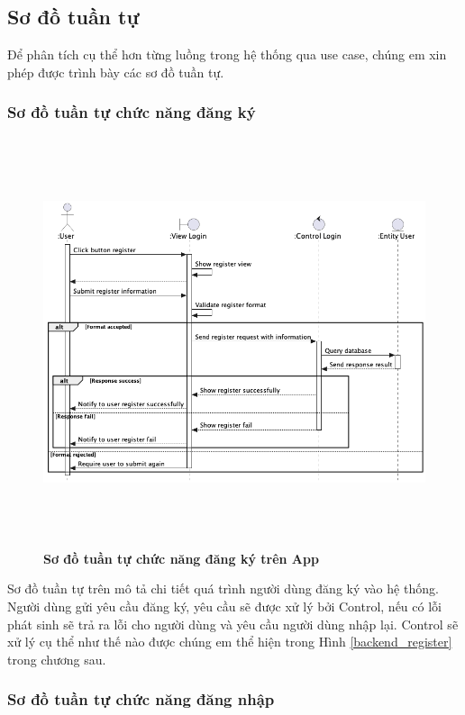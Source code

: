 \newpage
\subsection{Sơ đồ tuần tự}
Để phân tích cụ thể hơn từng luồng trong hệ thống qua use case, chúng em xin phép được trình bày các sơ đồ tuần
tự. 
\subsubsection{Sơ đồ tuần tự chức năng đăng ký}
  \begin{figure}[H]
        \centering
        \includegraphics[width=16cm,height=12cm]{Images/mobile_app/register.png}
        \caption[Sơ đồ tuần tự chức năng đăng ký trên App]{\bfseries \fontsize{12pt}{0pt}
        \selectfont Sơ đồ tuần tự chức năng đăng ký trên App}
        \label{register} %
  \end{figure}
  Sơ đồ tuần tự trên mô tả chi tiết quá trình người dùng đăng ký vào hệ thống. Người dùng gửi yêu cầu đăng ký, yêu cầu sẽ
  được xử lý bởi Control, nếu có lỗi phát sinh sẽ trả ra lỗi cho người dùng và yêu cầu người dùng nhập lại. Control
  sẽ xử lý cụ thể như thế nào được chúng em thể hiện trong Hình \ref{backend_register} trong chương sau.
\subsubsection{Sơ đồ tuần tự chức năng đăng nhập}

